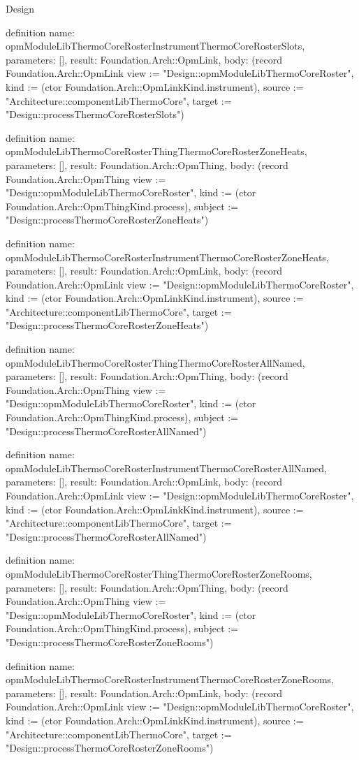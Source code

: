 \begin{lexlean}{Design}
\begin{semanticmodule}
definition{
  name: opmModuleLibThermoCoreRosterInstrumentThermoCoreRosterSlots,
  parameters: [],
  result: Foundation.Arch::OpmLink,
  body: (record Foundation.Arch::OpmLink {view := "Design::opmModuleLibThermoCoreRoster", kind := (ctor Foundation.Arch::OpmLinkKind.instrument), source := "Architecture::componentLibThermoCore", target := "Design::processThermoCoreRosterSlots"})
}

definition{
  name: opmModuleLibThermoCoreRosterThingThermoCoreRosterZoneHeats,
  parameters: [],
  result: Foundation.Arch::OpmThing,
  body: (record Foundation.Arch::OpmThing {view := "Design::opmModuleLibThermoCoreRoster", kind := (ctor Foundation.Arch::OpmThingKind.process), subject := "Design::processThermoCoreRosterZoneHeats"})
}

definition{
  name: opmModuleLibThermoCoreRosterInstrumentThermoCoreRosterZoneHeats,
  parameters: [],
  result: Foundation.Arch::OpmLink,
  body: (record Foundation.Arch::OpmLink {view := "Design::opmModuleLibThermoCoreRoster", kind := (ctor Foundation.Arch::OpmLinkKind.instrument), source := "Architecture::componentLibThermoCore", target := "Design::processThermoCoreRosterZoneHeats"})
}

definition{
  name: opmModuleLibThermoCoreRosterThingThermoCoreRosterAllNamed,
  parameters: [],
  result: Foundation.Arch::OpmThing,
  body: (record Foundation.Arch::OpmThing {view := "Design::opmModuleLibThermoCoreRoster", kind := (ctor Foundation.Arch::OpmThingKind.process), subject := "Design::processThermoCoreRosterAllNamed"})
}

definition{
  name: opmModuleLibThermoCoreRosterInstrumentThermoCoreRosterAllNamed,
  parameters: [],
  result: Foundation.Arch::OpmLink,
  body: (record Foundation.Arch::OpmLink {view := "Design::opmModuleLibThermoCoreRoster", kind := (ctor Foundation.Arch::OpmLinkKind.instrument), source := "Architecture::componentLibThermoCore", target := "Design::processThermoCoreRosterAllNamed"})
}

definition{
  name: opmModuleLibThermoCoreRosterThingThermoCoreRosterZoneRooms,
  parameters: [],
  result: Foundation.Arch::OpmThing,
  body: (record Foundation.Arch::OpmThing {view := "Design::opmModuleLibThermoCoreRoster", kind := (ctor Foundation.Arch::OpmThingKind.process), subject := "Design::processThermoCoreRosterZoneRooms"})
}

definition{
  name: opmModuleLibThermoCoreRosterInstrumentThermoCoreRosterZoneRooms,
  parameters: [],
  result: Foundation.Arch::OpmLink,
  body: (record Foundation.Arch::OpmLink {view := "Design::opmModuleLibThermoCoreRoster", kind := (ctor Foundation.Arch::OpmLinkKind.instrument), source := "Architecture::componentLibThermoCore", target := "Design::processThermoCoreRosterZoneRooms"})
}


\end{semanticmodule}
\end{lexlean}
